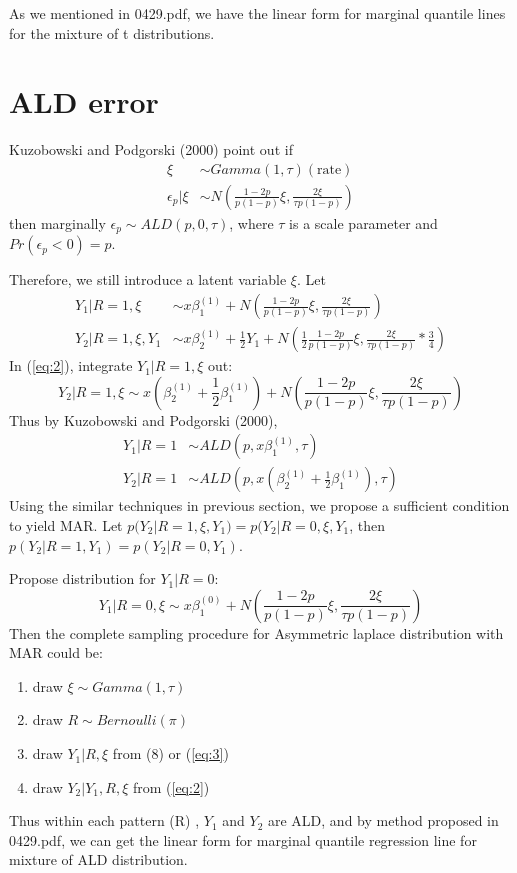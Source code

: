 \documentclass[12pt]{article}
\begin{document}
As we mentioned in 0429.pdf, we have the linear form for marginal  quantile lines for the mixture of t distributions.

\newpage

\section{ALD error}
Kuzobowski and Podgorski (2000) point out if
\begin{align*}
\xi & \sim Gamma(1, \tau) (\text{rate}) \\
\epsilon_p | \xi & \sim N \left( \frac{1 - 2p}{p(1 - p)}\xi, \frac{2\xi}{\tau p (1- p)} \right)
\end{align*}
then marginally $\epsilon_p \sim ALD(p, 0, \tau)$, where $\tau$ is a scale parameter and $Pr(\epsilon_p < 0 ) = p$.

Therefore, we still introduce a latent variable $\xi$. Let
\begin{align}
Y_1 | R = 1, \xi & \sim x\beta_1^{(1)} + N\left( \frac{1 - 2p}{p(1 - p)}\xi, \frac{2\xi}{\tau p (1- p)} \right) \\
Y_2 | R = 1, \xi, Y_1 & \sim x \beta_2^{(1)} + \frac{1}{2} Y_1 +  N\left( \frac{1}{2}\frac{1 - 2p}{p(1 - p)}\xi, \frac{2\xi}{\tau p (1- p)}* \frac{3}{4} \right) \label{eq:2}
\end{align}
In (\ref{eq:2}), integrate $Y_1|R = 1, \xi$ out:
\begin{displaymath}
Y_2 | R = 1, \xi    \sim x(\beta_2^{(1)} + \frac{1}{2}\beta_1^{(1)}) +  N\left(\frac{1 - 2p}{p(1 - p)}\xi, \frac{2\xi}{\tau p (1- p)} \right)
\end{displaymath}
Thus by Kuzobowski and Podgorski (2000),
\begin{align*}
Y_1 | R= 1 & \sim ALD(p, x\beta_{1}^{(1)}, \tau) \\
Y_2 | R = 1 & \sim  ALD(p, x(\beta_2^{(1)} + \frac{1}{2}\beta_1^{(1)}) , \tau)
\end{align*}
Using the similar techniques in previous section, we propose a sufficient condition to yield MAR. Let $p(Y_2 | R = 1, \xi, Y_1 ) = p(Y_2|R = 0, \xi, Y_1$, then $p(Y_2|R = 1, Y_1) = p(Y_2|R = 0, Y_1)$.

Propose distribution for $Y_1|R = 0$:
\begin{equation}
\label{eq:3}
Y_1|R = 0, \xi \sim x\beta_1^{(0)} +  N\left( \frac{1 - 2p}{p(1 - p)}\xi, \frac{2\xi}{\tau p (1- p)} \right)
\end{equation}
Then the complete sampling procedure for Asymmetric laplace distribution with MAR could be:
\begin{enumerate}
\item draw $\xi \sim Gamma(1, \tau)$
\item draw $R \sim Bernoulli(\pi)$
\item draw $Y_1 |R, \xi$ from (8) or (\ref{eq:3})
\item draw $Y_2 | Y_1, R, \xi$ from (\ref{eq:2})
\end{enumerate}
Thus within each pattern (R) , $Y_1$ and $Y_2$ are ALD, and by method proposed in 0429.pdf, we can get the linear form for marginal quantile regression line for mixture of ALD distribution.
\end{document}
